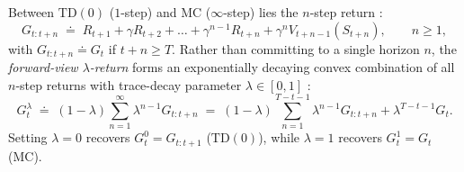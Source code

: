 \documentclass[../../../../master.tex]{subfiles}
\begin{document}
Between $\mathrm{TD}(0)$ ($1$-step) and MC ($\infty$-step) lies the $n$-step return :
\begin{equation}
  G_{t:t+n} \;\doteq\; R_{t+1} + \gamma R_{t+2} + \dots + \gamma^{n-1} R_{t+n} + \gamma^n V_{t+n-1}(S_{t+n}), \qquad n \ge 1,
  \label{eq:td:nstep_return}
\end{equation}
with $G_{t:t+n} \doteq G_t$ if $t + n \ge T$. Rather than committing to a single horizon $n$, the \emph{forward-view $\lambda$-return} forms an exponentially decaying convex combination of all $n$-step returns with trace-decay parameter $\lambda \in [0, 1]$  :
\begin{equation}
  G_t^\lambda \;\doteq\; (1 - \lambda) \sum_{n=1}^{\infty} \lambda^{n-1} G_{t:t+n} \;=\; (1 - \lambda)\sum_{n=1}^{T-t-1} \lambda^{n-1} G_{t:t+n} + \lambda^{T-t-1} G_t.
  \label{eq:td:lambda_return}
\end{equation}
Setting $\lambda = 0$ recovers $G_t^0 = G_{t:t+1}$ ($\mathrm{TD}(0)$), while $\lambda = 1$ recovers $G_t^1 = G_t$ (MC).
\end{document}
